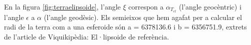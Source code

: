 \documentclass[11pt]{article}
\begin{document}
En la figura \ref{fig:terraelipsoide}, l'angle $\xi$ correspon a $\alpha_{T_{el}}$ (l'angle geocèntric) i l'angle $\epsilon$ a $\alpha$ (l'angle geodèsic). Els semieixos que hem agafat per a calcular el radi de la terra com a una esferoide són a = 6378136.6 i b = 6356751.9, extrets de l'article de Viquikipèdia: El·lipsoide de referència.

\end{document}
